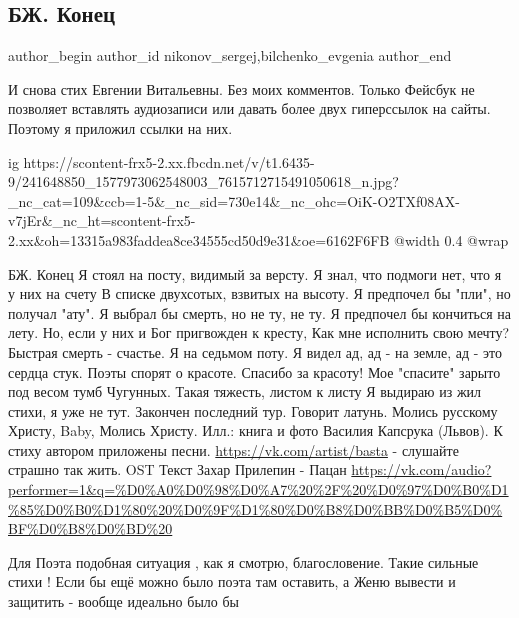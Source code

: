  
 
 
 
 
 
\subsection{БЖ. Конец}
\label{sec:09_09_2021.fb.nikonov_sergej.6.bilchenko_poezia_konec}
 
\ifcmt
 author_begin
   author_id nikonov_sergej,bilchenko_evgenia
 author_end
\fi

И снова стих Евгении Витальевны. Без моих комментов. Только Фейсбук не
позволяет вставлять аудиозаписи или давать более двух гиперссылок на сайты.
Поэтому я приложил ссылки на них.  

\ifcmt
  ig https://scontent-frx5-2.xx.fbcdn.net/v/t1.6435-9/241648850_1577973062548003_7615712715491050618_n.jpg?_nc_cat=109&ccb=1-5&_nc_sid=730e14&_nc_ohc=OiK-O2TXf08AX-v7jEr&_nc_ht=scontent-frx5-2.xx&oh=13315a983faddea8ce34555cd50d9e31&oe=6162F6FB
  @width 0.4
  @wrap 
\fi

БЖ. Конец
Я стоял на посту, видимый за версту.
Я знал, что подмоги нет, что я у них на счету
В списке двухсотых, взвитых на высоту.
Я предпочел бы "пли", но получал "ату".
Я выбрал бы смерть, но не ту, не ту.
Я предпочел бы кончиться на лету.
Но, если у них и Бог пригвожден к кресту,
Как мне исполнить свою мечту?
Быстрая смерть - счастье. Я на седьмом поту.
Я видел ад, ад - на земле, ад - это сердца стук.
Поэты спорят о красоте. Спасибо за красоту!
Мое "спасите" зарыто под весом тумб
Чугунных. Такая тяжесть, листом к листу
Я выдираю из жил стихи, я уже не тут.
Закончен последний тур.
Говорит латунь.
Молись русскому Христу,
Baby,
Молись Христу.
Илл.: книга и фото Василия Капсрука (Львов).
К стиху автором приложены песни.
\url{https://vk.com/artist/basta} - слушайте страшно так жить. OST Текст
Захар Прилепин - Пацан
\url{https://vk.com/audio?performer=1&q=%D0%A0%D0%98%D0%A7%20%2F%20%D0%97%D0%B0%D1%85%D0%B0%D1%80%20%D0%9F%D1%80%D0%B8%D0%BB%D0%B5%D0%BF%D0%B8%D0%BD%20}

\begin{itemize}
 
Для Поэта подобная ситуация , как я смотрю, благословение. Такие сильные стихи ! Если бы ещё можно было поэта там оставить, а Женю вывести и защитить - вообще идеально было бы
\end{itemize}

